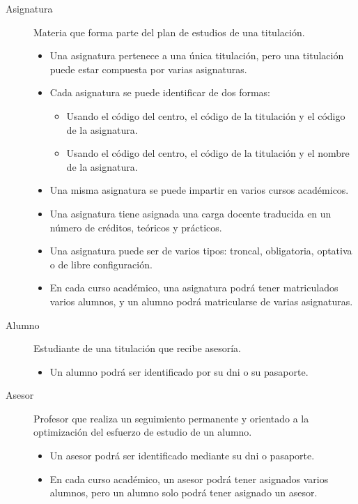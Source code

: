 \begin{description}
      \item[Asignatura] Materia que forma parte del plan de estudios de una
      titulación.
      \begin{itemize}
         \item Una asignatura pertenece a una única titulación, pero una
         titulación puede estar compuesta por varias asignaturas.
         \item Cada asignatura se puede identificar de dos formas:
         \begin{itemize}
            \item Usando el código del centro, el código de la titulación y el
            código de la asignatura.
            \item Usando el código del centro, el código de la titulación y el
            nombre de la asignatura.
         \end{itemize}
         \item Una misma asignatura se puede impartir en varios cursos
         académicos.
         \item Una asignatura tiene asignada una carga docente traducida en un
         número de créditos, teóricos y prácticos.
         \item Una asignatura puede ser de varios tipos: troncal, obligatoria,
         optativa o de libre configuración.
         \item En cada curso académico, una asignatura podrá tener matriculados
         varios alumnos, y un alumno podrá matricularse de varias asignaturas.
      \end{itemize}

      \item[Alumno] Estudiante de una titulación que recibe asesoría.
      \begin{itemize}
         \item Un alumno podrá ser identificado por su dni o su pasaporte.
      \end{itemize}

      \item[Asesor] Profesor que realiza un seguimiento permanente y orientado a
      la optimización del esfuerzo de estudio de un alumno.
      \begin{itemize}
         \item Un asesor podrá ser identificado mediante su dni o pasaporte.
         \item En cada curso académico, un asesor podrá tener asignados varios
         alumnos, pero un alumno solo podrá tener asignado un asesor.
      \end{itemize}


\end{description}
